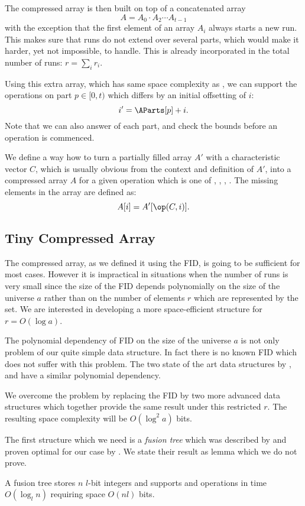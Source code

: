 The compressed array is then built on top of a concatenated array
$$A = A_0 \cdot A_2 \cdots A_{t-1}$$
with the exception that the first element of an array $A_i$ always starts a new run.
This makes sure that runs do not extend over several parts, which would make it harder, yet not impossible, to handle.
This is already incorporated in the total number of runs: $r = \sum_i r_i$.

Using this extra array, which has same space complexity as \ABefore{}, we can support the operations on part $p \in [0, t)$ which differs by an initial offsetting of $i$:
$$i' = \AParts[p] + i.$$
Note that we can also answer \size{} of each part, and check the bounds before an operation is commenced.

\bigbreak

We define a way how to turn a partially filled array $A'$ with a characteristic vector $C$, which is usually obvious from the context and definition of $A'$, into a compressed array $A$ for a given operation \op{} which is one of \pred{}, \succ{}, \prev{}, \nextt{}.
The missing elements in the array are defined as:
$$A[i] = A'[\op(C, i)].$$

\subsection{Tiny Compressed Array}

The compressed array, as we defined it using the FID, is going to be sufficient for most cases.
However it is impractical in situations when the number of runs is very small since the size of the FID depends polynomially on the size of the universe $a$ rather than on the number of elements $r$ which are represented by the set. 
We are interested in developing a more space-efficient structure for $r = O(\log a)$.

The polynomial dependency of FID on the size of the universe $a$ is not only problem of our quite simple data structure.
In fact there is no known FID which does not suffer with this problem.
The two state of the art data structures by \cite{patrascu2008succincter}, and \cite{grossi2009more} have a similar polynomial dependency.

We overcome the problem by replacing the FID by two more advanced data structures which together provide the same result under this restricted $r$.
The resulting space complexity will be $O(\log^2 a)$ bits.

\bigbreak

The first structure which we need is a \emph{fusion tree} which was described by \cite{fredman1993surpassing} and proven optimal for our case by \cite{puatracscu2006time}.
We state their result as lemma which we do not prove.
\begin{lemma}
	A fusion tree stores $n$ $l$-bit integers and supports \pred{} and \succ{} operations in time $O(\log_l n)$ requiring space $O(n l)$ bits.
\end{lemma}


